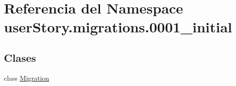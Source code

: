 \hypertarget{namespaceuser_story_1_1migrations_1_10001__initial}{}\section{Referencia del Namespace user\+Story.\+migrations.0001\+\_\+initial}
\label{namespaceuser_story_1_1migrations_1_10001__initial}
\subsection*{Clases}
\begin{DoxyCompactItemize}
\item 
class \hyperlink{classuser_story_1_1migrations_1_10001__initial_1_1_migration}{Migration}
\end{DoxyCompactItemize}
